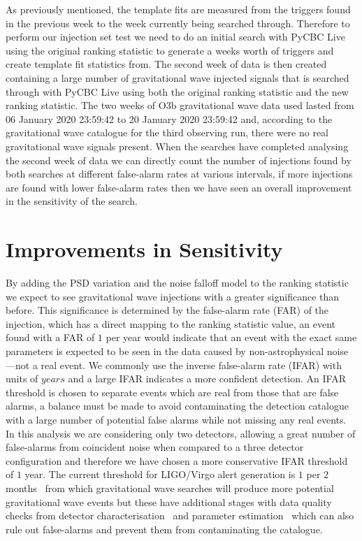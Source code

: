 As previously mentioned, the template fits are measured from the triggers found in the previous week to the week currently being searched through. Therefore to perform our injection set test we need to do an initial search with PyCBC Live using the original ranking statistic to generate a weeks worth of triggers and create template fit statistics from. The second week of data is then created containing a large number of gravitational wave injected signals that is searched through with PyCBC Live using both the original ranking statistic and the new ranking statistic. The two weeks of O3b gravitational wave data used lasted from 06 January 2020 23:59:42 to 20 January 2020 23:59:42 and, according to the gravitational wave catalogue for the third observing run, there were no real gravitational wave signals present. When the searches have completed analysing the second week of data we can directly count the number of injections found by both searches at different false-alarm rates at various intervals, if more injections are found with lower false-alarm rates then we have seen an overall improvement in the sensitivity of the search.

\section{\label{sec:pycbclive-sensitivity-improvements}Improvements in Sensitivity}

By adding the PSD variation and the noise falloff model to the ranking statistic we expect to see gravitational wave injections with a greater significance than before. This significance is determined by the false-alarm rate (FAR) of the injection, which has a direct mapping to the ranking statistic value, an event found with a FAR of $1$ per year would indicate that an event with the exact same parameters is expected to be seen in the data caused by non-astrophysical noise---not a real event. We commonly use the inverse false-alarm rate (IFAR) with units of $years$ and a large IFAR indicates a more confident detection. An IFAR threshold is chosen to separate events which are real from those that are false alarms, a balance must be made to avoid contaminating the detection catalogue with a large number of potential false alarms while not missing any real events. In this analysis we are considering only two detectors, allowing a great number of false-alarms from coincident noise when compared to a three detector configuration and therefore we have chosen a more conservative IFAR threshold of $1$ year. The current threshold for LIGO/Virgo alert generation is $1$ per $2$ months~\cite{PyCBC_Live:2018} from which gravitational wave searches will produce more potential gravitational wave events but these have additional stages with data quality checks from detector characterisation~\cite{O2O3_DetChar:2021} and parameter estimation~\cite{gwtc3:2023} which can also rule out false-alarms and prevent them from contaminating the catalogue.

